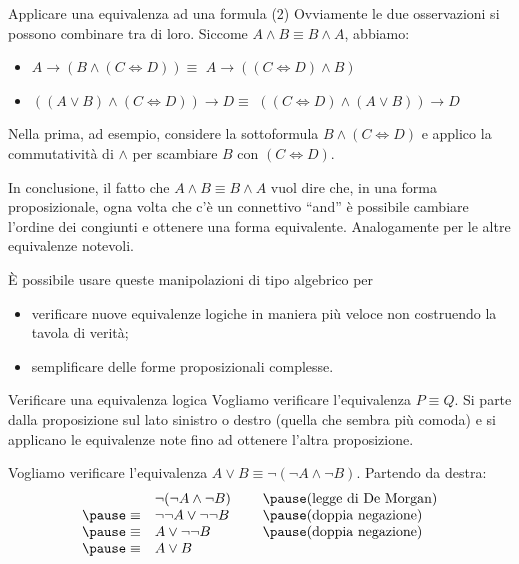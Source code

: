 \documentclass[10pt,dvipsnames,handout]{beamer}
\begin{document}
\begin{frame}{Applicare una equivalenza ad una formula (2)}
    Ovviamente le due osservazioni si possono combinare tra di loro. Siccome $A \wedge B \equiv B \wedge A$, abbiamo:
    \begin{itemize}
        \item $A \to (B \wedge (C \iff D))  \equiv$ \pause $A \to ((C \iff D) \wedge B)$ \pause
        \item $((A \vee B) \wedge (C \iff D)) \to D \equiv$ \pause $( (C \iff D) \wedge (A \vee B)) \to D$
    \end{itemize}

    \pause\medskip
    Nella prima, ad esempio, considere la sottoformula $B \wedge (C \iff D)$ e applico la commutatività di $\wedge$ per scambiare $B$ con $(C \iff D)$.

    \pause\medskip
    In conclusione, il fatto che $A \wedge B \equiv B \wedge A$ vuol dire che, in una forma proposizionale, ogna volta che c'è un connettivo ``and'' è possibile cambiare l'ordine dei congiunti e ottenere una forma equivalente. Analogamente per le altre equivalenze notevoli.

    \medskip
    È possibile usare queste manipolazioni di tipo algebrico per
    \begin{itemize}
        \item verificare nuove equivalenze logiche in maniera più veloce non costruendo la tavola di verità;
        \item semplificare delle forme proposizionali complesse.
    \end{itemize}
\end{frame}

\begin{frame}{Verificare una equivalenza logica}
    Vogliamo verificare l'equivalenza $P \equiv Q$.  Si parte dalla proposizione sul lato sinistro o destro (quella che sembra più comoda) e si applicano le equivalenze note fino ad ottenere l'altra proposizione.

    \begin{example}
        Vogliamo verificare l'equivalenza $A \vee B \equiv \neg(\neg A \wedge \neg B)$. Partendo da destra:
        \[
            \begin{array}{rl@{\hspace{0.8cm}}l}
                              & \neg(\neg A \wedge \neg B) & \pause \text{(legge di De Morgan)} \\
                \pause \equiv & \neg\neg A \vee \neg\neg B & \pause \text{(doppia negazione)}   \\
                \pause \equiv & A \vee \neg\neg B          & \pause \text{(doppia negazione)}   \\
                \pause \equiv & A \vee B
            \end{array}
        \]
    \end{example}
\end{frame}
\end{document}
